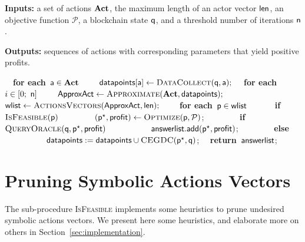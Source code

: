 \setlength{\textfloatsep}{10pt}
\begin{algorithm}[h!]
  \caption{Attack vectors synthesis procedure}
  \label{alg:enu}
  
  \textbf{Inputs: } a set of actions $\mathbf{Act}$, the maximum length of an actor vector $\mathsf{len}$, an objective function $\mathcal{P}$, a blockchain state $\mathsf{q}$, and a threshold number of iterations $\mathsf{n}$.
  
  \textbf{Outputs: } sequences of actions with corresponding parameters that yield positive profits.
  \begin{algorithmic}[1]
  \State \ \ \textbf{for each}\ $\mathsf{a} \in \mathbf{Act}$ \label{algo1:line0}
  \State \ \ \ \ $\mathsf{datapoints}[\mathsf{a}] \leftarrow \textsc{DataCollect}(\mathsf{q}, \mathsf{a});$ \label{algo1:line1}
  \State \ \ \textbf{for each}\ $i \in [0;\ \mathsf{n}]$ \label{algo1:line2}
  \State \ \ \ \ $\mathsf{ApproxAct} \leftarrow \textsc{Approximate}(\mathbf{Act},\mathsf{datapoints});$ \label{algo1:line3}
  \State \ \ \ \ $\mathsf{wlist} \leftarrow \textsc{ActionsVectors}(\mathsf{ApproxAct}, \mathsf{len});$ \label{algo1:line4}
  \State \ \ \ \ \textbf{for each}\ $\mathsf{p} \in \mathsf{wlist}$ \label{algo1:line5}
  \State \ \ \ \ \ \ \textbf{if}\ $\textsc{IsFeasible}(\mathsf{p})$ \label{algo1:line6}
  \State \ \ \ \ \ \ \ \ $(\mathsf{p}^\star, \textsf{profit}) \leftarrow \textsc{Optimize}(\mathsf{p}, \mathcal{P})$; \label{algo1:line7}
  \State \ \ \ \ \ \ \ \ \textbf{if}\ $\textsc{QueryOracle}(\mathsf{q}, \mathsf{p}^\star, \textsf{profit})$ \label{algo1:line8}
  \State \ \ \ \ \ \ \ \ \ \ $\mathsf{answerlist}.\textsf{add}(\mathsf{p}^\star,\textsf{profit})$; \label{algo1:line9}
  \State \ \ \ \ \ \ \ \ \textbf{else} 
  \State \ \ \ \ \ \ \ \ \ \ $\mathsf{datapoints} := \mathsf{datapoints} \cup \textsc{CEGDC}(\mathsf{p}^\star, \mathsf{q})$; \label{algo1:line10}
  \State \ \ \textbf{return}\ $\mathsf{answerlist}$;
  \EndProcedure
  \end{algorithmic}
\end{algorithm}


    
    

\section{Pruning Symbolic Actions Vectors} \label{sec:isfeasible} 
The sub-procedure \textsc{IsFeasible} implements some heuristics to prune undesired symbolic actions vectors. We present here some heuristics, and elaborate more on others in Section~\ref{sec:implementation}. 

